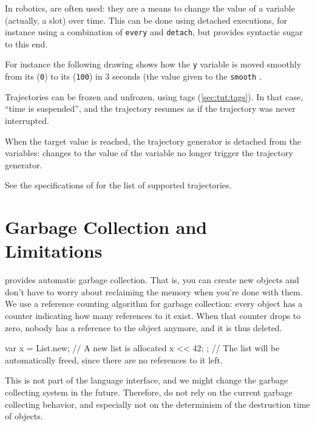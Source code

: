 In robotics,  are often used: they are a
means to change the value of a variable (actually, a slot) over time.
This can be done using detached executions, for instance using a
combination of \lstinline{every} and \lstinline{detach}, but \us
provides syntactic sugar to this end.

For instance the following drawing shows how the \lstinline{y} variable is
moved smoothly from its  (\lstinline|0|) to its
 (\lstinline|100|) in 3 seconds (the value given to the
\lstinline{smooth} .


Trajectories can be frozen and unfrozen, using tags
(\autoref{sec:tut:tags}).  In that case, ``time is suspended'', and
the trajectory resumes as if the trajectory was never interrupted.


When the target value is reached, the trajectory generator is detached
from the variables: changes to the value of the variable no longer
trigger the trajectory generator.


See the specifications of  for the list
of supported trajectories.

\section{Garbage Collection and Limitations}
\label{sec:lang:gc}

\us provides automatic garbage collection. That is, you can create new
objects and don't have to worry about reclaiming the memory when you're done
with them. We use a reference counting algorithm for garbage collection:
every object has a counter indicating how many references to it exist. When
that counter drops to zero, nobody has a reference to the object anymore,
and it is thus deleted.

\begin{urbiunchecked}
{
  var x = List.new; // A new list is allocated
  x << 42;
};
// The list will be automatically freed, since there are no references to it left.
\end{urbiunchecked}

This is not part of the language interface, and we might change the garbage
collecting system in the future. Therefore, do not rely on the current
garbage collecting behavior, and especially not on the determinism of the
destruction time of objects.

